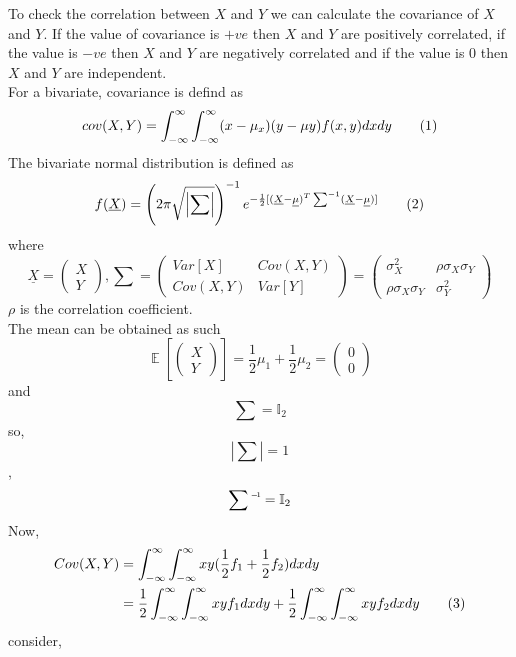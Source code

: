 \documentclass{article}
\theoremstyle{remark}
\renewcommand{\vec}[1]{\underline{#1}}
\newcommand\numberthis{\addtocounter{equation}{1}\tag{\theequation}}
\newcommand\inv[1]{#1\raisebox{1.15ex}{$\scriptscriptstyle-\!1$}}
\begin{document}
To check the correlation between $X$ and $Y$ we can calculate the covariance of $X$ and $Y$. If the value of covariance is $+ve$ then $ X$ and $Y$ are positively correlated, if the value is $-ve$ then $X$ and $Y$ are negatively correlated and if the value is 0 then $X$ and $Y$ are independent.\\
\newline
For a bivariate, covariance is defind as \\
\[ cov(X,Y) = \int_{-\infty}^{\infty} \int_{-\infty}^{\infty} (x-\mu_{x}) (y-\mu{y}) f(x,y) dx dy \numberthis \label{-1}\]
The bivariate normal distribution is defined as 
\[
f(\vec{X}) = \left ( 2\pi\sqrt{\left | \sum \right |} \right )^{-1} e^{-\frac{1}{2}[(\vec{X}-\vec{\mu})^T\sum^{-1}(\vec{X}-\vec{\mu})]} \numberthis \label{0}\]
where
\[ 
\vec{X} = \begin{pmatrix}
X\\ 
Y
\end{pmatrix}, 
\sum =  \begin{pmatrix}
 Var[X]& Cov(X,Y)\\ 
 Cov(X,Y)& Var[Y] 
\end{pmatrix} = \begin{pmatrix}
\sigma_X^2  & \rho \sigma_X \sigma_Y\\ 
\rho \sigma_X \sigma_Y & \sigma_Y^2
\end{pmatrix}
\]
$\rho$ is the correlation coefficient.\\
\newline
The mean can be obtained as such
\[ \mathop{\mathbb{E}}\left[\begin{pmatrix} X\\ Y \end{pmatrix} \right ]= \frac{1}{2} \mu_{1} + \frac{1}{2} \mu_{2} = \begin{pmatrix} 0\\0 \end{pmatrix}\]
and 
\[
    \sum = \mathbb{I}_2
\]
so, \[\left | \sum \right | = 1\], \[ \inv{\sum} = \mathbb{I}_2 \]
Now,
\begin{align*}
    Cov(X,Y) &=  \int_{-\infty}^{\infty} \int_{-\infty}^{\infty} x y (\frac{1}{2}f_1+\frac{1}{2}f_2) dx dy \\
    &= \frac{1}{2} \int_{-\infty}^{\infty} \int_{-\infty}^{\infty} x y f_1 dx dy + \frac{1}{2} \int_{-\infty}^{\infty} \int_{-\infty}^{\infty} x y f_2 dx dy \numberthis \label{1}\\
\end{align*}
consider,
\end{document}
